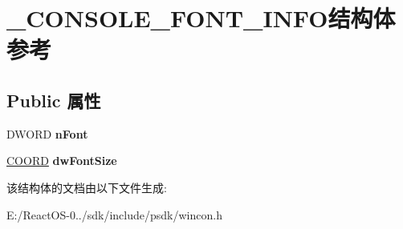 \hypertarget{struct___c_o_n_s_o_l_e___f_o_n_t___i_n_f_o}{}\section{\+\_\+\+C\+O\+N\+S\+O\+L\+E\+\_\+\+F\+O\+N\+T\+\_\+\+I\+N\+F\+O结构体 参考}
\label{struct___c_o_n_s_o_l_e___f_o_n_t___i_n_f_o}
\subsection*{Public 属性}
\begin{DoxyCompactItemize}
\item 
\mbox{\label{struct___c_o_n_s_o_l_e___f_o_n_t___i_n_f_o_a6c464d884cb39205d47e6bfe8a14ea29}} 
D\+W\+O\+RD {\bfseries n\+Font}
\item 
\mbox{\label{struct___c_o_n_s_o_l_e___f_o_n_t___i_n_f_o_a888e1e2d078e3d272f34b74e51bade53}} 
\hyperlink{struct___c_o_o_r_d}{C\+O\+O\+RD} {\bfseries dw\+Font\+Size}
\end{DoxyCompactItemize}


该结构体的文档由以下文件生成\+:\begin{DoxyCompactItemize}
\item 
E\+:/\+React\+O\+S-\/0../sdk/include/psdk/wincon.\+h\end{DoxyCompactItemize}
